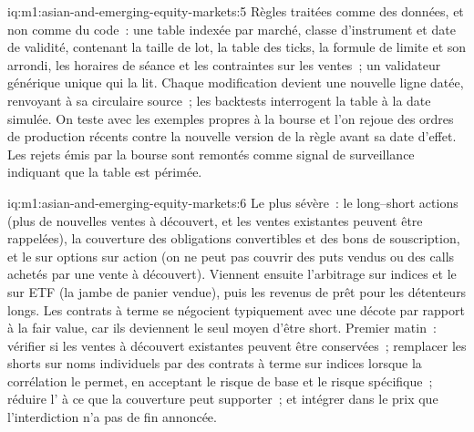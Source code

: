 \begin{solution}{iq:m1:asian-and-emerging-equity-markets:5}
Règles traitées comme des données, et non comme du code~: une table indexée par marché, classe d'instrument et
date de validité, contenant la taille de lot, la table des ticks, la formule de limite et son arrondi,
les horaires de séance et les contraintes sur les ventes~; un validateur générique unique qui la lit.
Chaque modification devient une nouvelle ligne datée, renvoyant à sa circulaire source~; les backtests
interrogent la table à la date simulée. On teste avec les exemples propres à la bourse et l'on rejoue
des ordres de production récents contre la nouvelle version de la règle avant sa date d'effet.
Les rejets émis par la bourse sont remontés
comme signal de surveillance indiquant que la table est périmée.
\end{solution}

\begin{solution}{iq:m1:asian-and-emerging-equity-markets:6}
Le plus sévère~: le long--short actions (plus de nouvelles ventes à découvert, et les ventes existantes
peuvent être rappelées), la couverture des obligations convertibles et des bons de souscription, et le
 sur options sur action (on ne peut pas couvrir des puts vendus ou des calls achetés
par une vente à découvert). Viennent ensuite l'arbitrage sur indices et le  sur ETF
(la jambe de panier vendue), puis les revenus de prêt pour les détenteurs longs. Les contrats à terme
se négocient typiquement avec une décote par rapport à la fair value, car ils deviennent le seul moyen d'être short.
Premier matin~: vérifier si les ventes à découvert existantes peuvent être conservées~; remplacer les shorts
sur noms individuels par des contrats à terme sur indices lorsque la corrélation le permet, en acceptant
le risque de base et le risque spécifique~; réduire l' à ce que la couverture peut supporter~;
et intégrer dans le prix que l'interdiction n'a pas de fin annoncée.
\end{solution}

